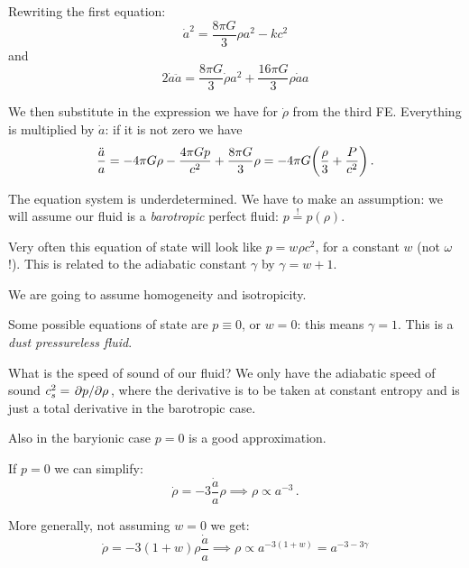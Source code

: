 \documentclass[main.tex]{subfiles}
\begin{document}


Rewriting the first equation:
\begin{equation}
  \dot{a}^2 = \frac{8 \pi G}{3} \rho a^2 - k c^2
\end{equation}
and
\begin{equation}
  2 \dot{a} \ddot{a} = 
  \frac{8 \pi G}{3} \dot{\rho} a^2 + \frac{16 \pi G}{3} \rho \dot{a} a 
\end{equation}

We then substitute in the expression we have for \(\dot{\rho} \) from the third FE.
Everything is multiplied by \(\dot{a} \): if it is not zero we have
\begin{equation}
  \frac{\ddot{a}}{a} = - 4 \pi G \rho - \frac{4 \pi G p}{c^2} + \frac{8 \pi G}{3} \rho= 
  - 4 \pi G \qty(\frac{\rho}{3} + \frac{P}{c^2})\,.
\end{equation}

The equation system is underdetermined. We have to make an assumption: we will assume our fluid is a \emph{barotropic} perfect fluid: \(p \overset{!}{=} p(\rho)\).

Very often this equation of state will look like \(p = w \rho c^2\), for a constant \(w\) (not \(\omega\)!). This is related to the adiabatic constant \(\gamma\) by \(\gamma = w+1\).

We are going to assume homogeneity and isotropicity.

Some possible equations of state are \(p \equiv 0\), or \(w =0\): this means \(\gamma =1 \). This is a \emph{dust pressureless fluid}.

What is the speed of sound of our fluid? We only have the adiabatic speed of sound \(c_s^2 = \pdv*{p}{\rho}\), where the derivative is to be taken at constant entropy and is just a total derivative in the barotropic case.

Also in the baryionic case \(p=0\) is a good approximation.

If \(p=0\) we can simplify:
\begin{equation}
  \dot{\rho} = -3 \frac{\dot{a} }{a} \rho \implies 
  \rho \propto a^{-3}\,.
\end{equation}

More generally, not assuming \(w=0\) we get:
\begin{equation}
  \dot{\rho} = -3 (1+w) \rho \frac{\dot{a} }{a} \implies \rho \propto a^{-3 (1+w)} = a^{-3 -3\gamma}
\end{equation}
\end{document}
